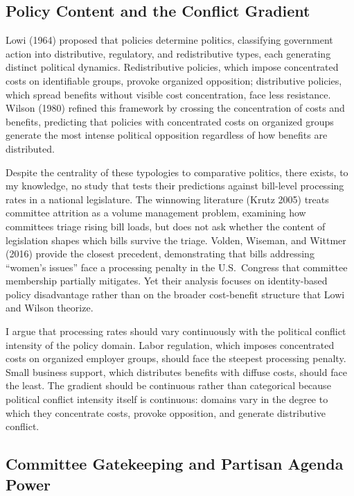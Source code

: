 \documentclass[11pt]{article}
\begin{document}
\subsection{Policy Content and the Conflict Gradient}

Lowi (1964) proposed that policies determine politics, classifying government action into distributive, regulatory, and redistributive types, each generating distinct political dynamics. Redistributive policies, which impose concentrated costs on identifiable groups, provoke organized opposition; distributive policies, which spread benefits without visible cost concentration, face less resistance. Wilson (1980) refined this framework by crossing the concentration of costs and benefits, predicting that policies with concentrated costs on organized groups generate the most intense political opposition regardless of how benefits are distributed.

Despite the centrality of these typologies to comparative politics, there exists, to my knowledge, no study that tests their predictions against bill-level processing rates in a national legislature. The winnowing literature (Krutz 2005) treats committee attrition as a volume management problem, examining how committees triage rising bill loads, but does not ask whether the content of legislation shapes which bills survive the triage. Volden, Wiseman, and Wittmer (2016) provide the closest precedent, demonstrating that bills addressing ``women's issues'' face a processing penalty in the U.S.\ Congress that committee membership partially mitigates. Yet their analysis focuses on identity-based policy disadvantage rather than on the broader cost-benefit structure that Lowi and Wilson theorize.

I argue that processing rates should vary continuously with the political conflict intensity of the policy domain. Labor regulation, which imposes concentrated costs on organized employer groups, should face the steepest processing penalty. Small business support, which distributes benefits with diffuse costs, should face the least. The gradient should be continuous rather than categorical because political conflict intensity itself is continuous: domains vary in the degree to which they concentrate costs, provoke opposition, and generate distributive conflict.

\subsection{Committee Gatekeeping and Partisan Agenda Power}
\end{document}
